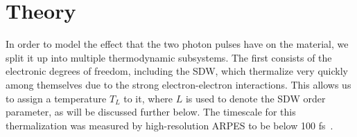 \section{Theory}


In order to model the effect that the two photon pulses have on the material, we split it up into multiple thermodynamic subsystems.
The first consists of the electronic degrees of freedom, including the SDW, which thermalize very quickly among themselves due to the strong electron-electron interactions.
This allows us to assign a temperature $T_L$ to it, where $L$ is used to denote the SDW order parameter, as will be discussed further below.
The timescale for this thermalization was measured by high-resolution ARPES to be below 100 fs~\cite{Nicholson2016}.

